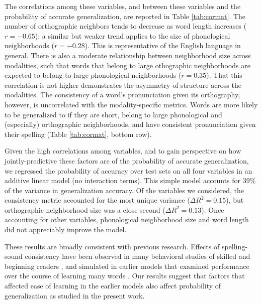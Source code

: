 \documentclass[10pt,letterpaper]{article}
\begin{document}
The correlations among these variables, and between these variables and the probability of accurate generalization, are reported in Table \ref{tab:cormat}.
The number of orthographic neighbors tends to decrease as word length increases ($r = -0.65$); a similar but weaker trend applies to the size of phonological neighborhoods ($r = -0.28$).
This is representative of the English language in general.
There is also a moderate relationship between neighborhood size across modalities, such that words that belong to large othographic neighborhoods are expected to belong to large phonological neighborhoods ($r = 0.35$).
That this correlation is not higher demonstrates the asymmetry of structure across the modalities.
The consistency of a word's pronunciation given its orthography, however, is uncorrelated with the modality-specific metrics.
Words are more likely to be generalized to if they are short, belong to large phonological and (especially) orthographic neighborhoods, and have consistent pronunciation given their spelling (Table \ref{tab:cormat}, bottom row).

Given the high correlations among variables, and to gain perspective on how jointly-predictive these factors are of the probability of accurate generalization, we regressed the probability of accuracy over test sets on all four variables in an additive linear model (no interaction terms).
This simple model accounts for 39\% of the variance in generalization accuracy.
Of the variables we considered, the consistency metric accounted for the most unique variance ($\Delta R^2 = 0.15$), but orthographic neighborhood size was a close second ($\Delta R^2 = 0.13$). Once accounting for other variables, phonological neighborhood size and word length did not appreciably improve the model.

These results are broadly consistent with previous research. Effects of spelling-sound consistency have been observed in many behavioral studies of skilled and beginning readers \cite{Jared1990}, and simulated in earlier models that examined performance over the course of learning many words \cite{Seidenberg1989,Plaut1996}. Our results suggest that factors that affected ease of learning in the earlier models also affect probability of generalization as studied in the present work. 
\end{document}

